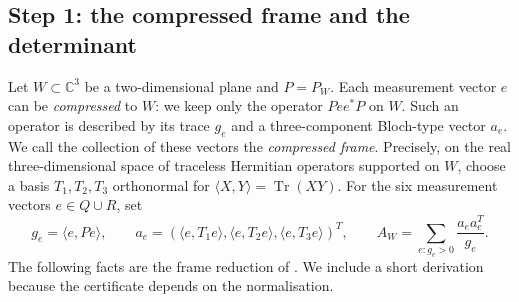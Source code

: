 \documentclass[11pt,a4paper]{article}
\numberwithin{equation}{section}
\theoremstyle{remark}\newtheorem{remark}[theorem]{Remark}
\newcommand{\C}{\mathbb C}\newcommand{\R}{\mathbb R}
\DeclareMathOperator{\Tr}{Tr}
\begin{document}
\subsection{Step 1: the compressed frame and the determinant}
Let $W\subset\C^3$ be a two-dimensional plane and $P=P_W$. Each measurement vector $e$ can be \emph{compressed} to $W$: we keep only the operator $Pe e^*P$ on $W$. Such an operator is described by its trace $g_e$ and a three-component Bloch-type vector $a_e$. We call the collection of these vectors the \emph{compressed frame}. Precisely, on the real three-dimensional space of traceless Hermitian operators supported on $W$, choose a basis $T_1,T_2,T_3$ orthonormal for $\langle X,Y\rangle=\Tr(XY)$. For the six measurement vectors $e\in Q\cup R$, set
\[
g_e=\langle e,Pe\rangle,\qquad
a_e=(\langle e,T_1e\rangle,\langle e,T_2e\rangle,\langle e,T_3e\rangle)^T,
\qquad A_W=\sum_{e:g_e>0}\frac{a_ea_e^T}{g_e}.
\]
The following facts are the frame reduction of \cite[Sections~6.3--6.4]{qian}. We include a short derivation because the certificate depends on the normalisation.
\end{document}
